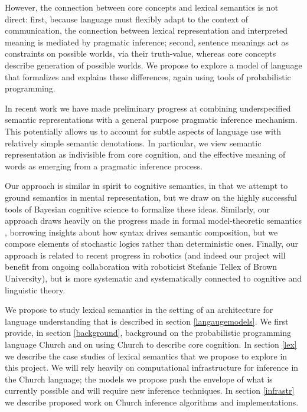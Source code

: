 \documentclass[12pt]{article}
\begin{document}
However, the connection between core concepts and lexical semantics is not direct: 
first, because language must flexibly adapt to the context of communication, the connection between lexical representation and interpreted meaning is mediated by pragmatic inference;
second, sentence meanings act as constraints on possible worlds, via their truth-value, whereas core concepts describe generation of possible worlds.
We propose to explore a model of language that formalizes and explains these differences, again using tools of probabilistic programming. 

In recent work we have made preliminary progress at combining underspecified semantic representations with a general purpose pragmatic inference mechanism.
This potentially allows us to account for subtle aspects of language use with relatively simple semantic denotations.
In particular, we view semantic representation as indivisible from core cognition, and the effective meaning of words as emerging from a pragmatic inference process. 

Our approach is similar in spirit to cognitive semantics, in that we attempt to ground semantics in mental representation, but we draw on the highly successful tools of Bayesian cognitive science to formalize these ideas. 
Similarly, our approach draws heavily on the progress made in formal model-theoretic semantics \cite{montague1973,heimkratzer1998}, borrowing insights about how syntax drives semantic composition, but we compose elements of stochastic logics rather than deterministic ones.
Finally, our approach is related to recent progress in robotics (and indeed our project will benefit from ongoing collaboration with roboticist Stefanie Tellex of Brown University), but is more systematic and systematically connected to cognitive and linguistic theory. 

We propose to study lexical semantics in the setting of an architecture for language understanding that is described in section \ref{langaugemodels}. We first provide, in section \ref{background}, background on the probabilistic programming language Church and on using Church to describe core cognition. In section \ref{lex} we describe the case studies of lexical semantics that we propose to explore in this project. We will rely heavily on computational infrastructure for inference in the Church language; the models we propose push the envelope of what is currently possible and will require new inference techniques. In section \ref{infrastr} we describe proposed work on Church inference algorithms and implementations.
\end{document}

